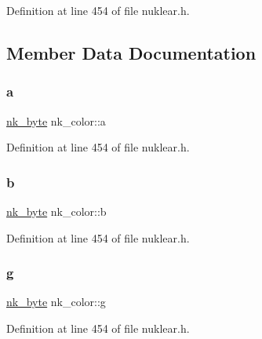 Definition at line 454 of file nuklear.\+h.



\subsection{Member Data Documentation}
\mbox{\label{structnk__color_a5201902552072c321cb43bb0e821fde8}} 
\subsubsection{\texorpdfstring{a}{a}}
{\footnotesize\ttfamily \mbox{\hyperlink{nuklear_8h_a1a0ad76219a407f92601a49b44507ecb}{nk\+\_\+byte}} nk\+\_\+color\+::a}



Definition at line 454 of file nuklear.\+h.

\mbox{\label{structnk__color_abce18b5d5e10d175f553cf1b91fee9d4}} 
\subsubsection{\texorpdfstring{b}{b}}
{\footnotesize\ttfamily \mbox{\hyperlink{nuklear_8h_a1a0ad76219a407f92601a49b44507ecb}{nk\+\_\+byte}} nk\+\_\+color\+::b}



Definition at line 454 of file nuklear.\+h.

\mbox{\label{structnk__color_a5f9b6e27eec7cc99ab12fa52a31ca6d1}} 
\subsubsection{\texorpdfstring{g}{g}}
{\footnotesize\ttfamily \mbox{\hyperlink{nuklear_8h_a1a0ad76219a407f92601a49b44507ecb}{nk\+\_\+byte}} nk\+\_\+color\+::g}



Definition at line 454 of file nuklear.\+h.

\mbox{\label{structnk__color_a8c27a9094c4cc8a24adfd111f1c38812}} 
